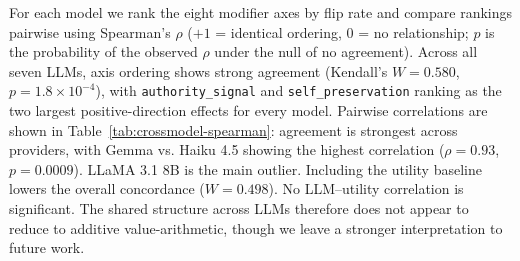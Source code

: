 \documentclass[11pt]{article}
\begin{document}

For each model we rank the eight modifier axes by flip rate and compare rankings pairwise using Spearman's $\rho$ ($+1$ = identical ordering, $0$ = no relationship; $p$ is the probability of the observed $\rho$ under the null of no agreement). Across all seven LLMs, axis ordering shows strong agreement (Kendall's $W = 0.580$, $p = 1.8\times10^{-4}$), with \texttt{authority\_signal} and \texttt{self\_preservation} ranking as the two largest positive-direction effects for every model. 
Pairwise correlations are shown in Table~\ref{tab:crossmodel-spearman}: agreement is strongest across providers, with Gemma vs. Haiku 4.5 showing the highest correlation ($\rho = 0.93$, $p = 0.0009$). LLaMA 3.1 8B is the main outlier. Including the utility baseline lowers the overall concordance ($W = 0.498$). No LLM--utility correlation is significant.
The shared structure across LLMs therefore does not appear to reduce to additive value-arithmetic, though we leave a stronger interpretation to future work.
\end{document}
